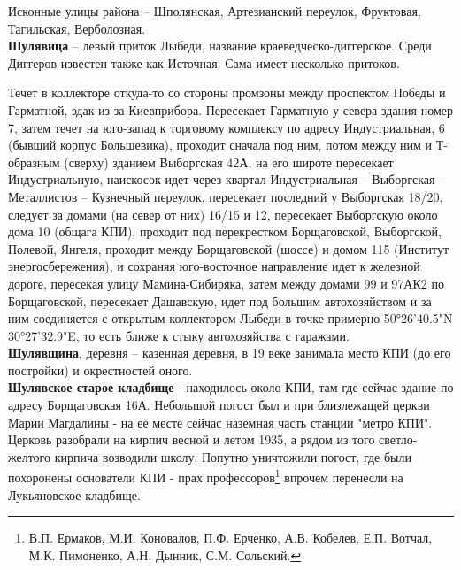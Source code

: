 Исконные улицы района – Шполянская, Артезианский переулок, Фруктовая, Тагильская, Верболозная.\\

\textbf{Шулявица} – левый приток Лыбеди, название краеведческо-диггерское. Среди Диггеров известен также как Источная. Сама имеет нес\-колько притоков.

Течет в коллекторе откуда-то со стороны промзоны между проспектом Победы и Гарматной, эдак из-за Киевприбора. Пересекает Гарматную у севера здания номер 7, затем течет на юго-запад к торговому комплексу по адресу Индустриальная, 6 (бывший корпус Большевика), проходит сначала под ним, потом между ним и Т-образным (сверху) зданием Выборгская 42А, на его широте пересекает Индус\-триальную, наискосок идет через квартал Ин\-дустриальная – Выборгская – Металлистов – Кузнечный переулок, пересекает последний у Выборгская 18/20, следует за домами (на север от них) 16/15 и 12, пересекает Выборгскую около дома 10 (общага КПИ), проходит под перекрестком Борщаговской, Выборгской, Полевой, Янгеля, проходит между Борщаговской (шоссе) и домом 115 (Институт энергосбережения), и сохраняя юго-восточное направление идет к железной дороге, пересекая улицу Мамина-Сибиряка, затем между домами 99 и 97АК2 по Борщаговской, пересекает Дашавскую, идет под большим автохозяйством и за ним соединяется с открытым коллектором Лыбеди в точке примерно 50°26'40.5"N 30°27'32.9"E, то есть ближе к стыку автохозяйства с гаражами.\\


\textbf{Шулявщина}, деревня – казенная деревня, в 19 веке занимала место КПИ (до его постройки) и окрестностей оного.\\

\textbf{Шулявское старое кладбище} - находилось около КПИ, там где сейчас здание по адресу Борщаговская 16А. Небольшой погост был и при близлежащей церкви Марии Магдалины - на ее месте сейчас наземная часть станции "метро КПИ". Церковь разобрали на кирпич весной и летом 1935, а рядом из того светло-желтого кирпича возводили школу. Попутно уничтожили погост, где были похоронены основатели КПИ - прах профессоров\footnote{В.П. Ермаков, М.И. Коновалов, П.Ф. Ерченко, А.В. Кобелев, Е.П. Вотчал, М.К. Пимоненко, А.Н. Дынник, С.М. Сольский.} впрочем перенесли на Лукьяновское кладбище.



